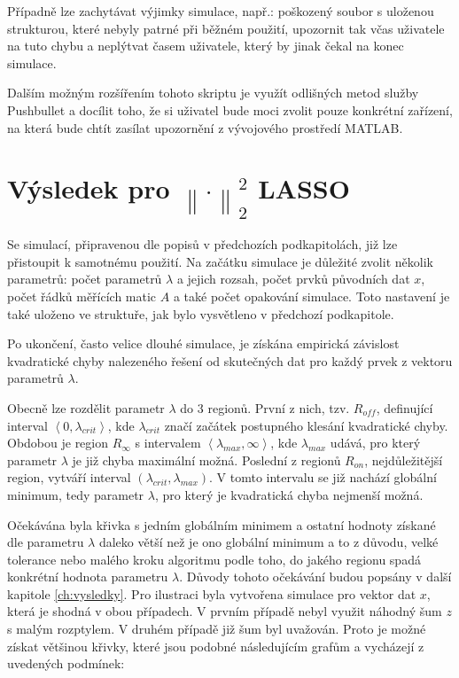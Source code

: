 \documentclass[FM,BP]{tulthesis}
\begin{document}
Případně lze zachytávat výjimky simulace, např.: poškozený soubor s uloženou strukturou, které nebyly patrné při běžném použití, upozornit tak včas uživatele na tuto chybu a neplýtvat časem uživatele, který by jinak čekal na konec simulace.

Dalším možným rozšířením tohoto skriptu je využít odlišných metod služby Pushbullet a docílit toho, že si uživatel bude moci zvolit pouze konkrétní zařízení, na která bude chtít zasílat upozornění z vývojového prostředí MATLAB.

\section{Výsledek pro $\left\| \cdot \right\|_{2}^{2}$ LASSO}
\label{subch:resultL22}
Se simulací, připravenou dle popisů v předchozích podkapitolách, již lze přistoupit k samotnému použití. Na začátku simulace je důležité zvolit několik parametrů: počet parametrů $\lambda$ a jejich rozsah, počet prvků původních dat $x$, počet řádků měřících matic $A$ a také počet opakování simulace. Toto nastavení je také uloženo ve struktuře, jak bylo vysvětleno v předchozí podkapitole. 

Po ukončení, často velice dlouhé simulace, je získána empirická závislost kvadratické chyby nalezeného řešení od skutečných dat pro každý prvek z vektoru parametrů $\lambda$. 

Obecně lze rozdělit parametr $\lambda$ do 3 regionů. První z nich, tzv. $R_{off}$, definující interval $\left\langle 0, \lambda_{crit}\right\rangle$, kde $\lambda_{crit}$ značí začátek postupného klesání kvadratické chyby. Obdobou je region $R_{\infty}$ s intervalem $\left\langle\lambda_{max}, \infty\right\rangle$, kde $\lambda_{max}$ udává, pro který parametr $\lambda$ je již chyba maximální možná. Poslední z regionů $R_{on}$, nejdůležitější region, vytváří interval $\left(\lambda_{crit}, \lambda_{max}\right)$. V tomto intervalu se již nachází globální minimum, tedy parametr $\lambda$, pro který je kvadratická chyba nejmenší možná.

Očekávána byla křivka s jedním globálním minimem a ostatní hodnoty získané dle parametru $\lambda$ daleko větší než je ono globální minimum a to z důvodu, velké tolerance nebo malého kroku algoritmu podle toho, do jakého regionu spadá konkrétní hodnota parametru $\lambda$. Důvody tohoto očekávání budou popsány v další kapitole \ref{ch:vysledky}. Pro ilustraci byla vytvořena simulace pro vektor dat $x$, která je shodná v obou případech. V prvním případě nebyl využit náhodný šum $z$ s malým rozptylem. V druhém případě již šum byl uvažován. Proto je možné získat většinou křivky, které jsou podobné následujícím grafům a vycházejí z uvedených podmínek:
\end{document}

